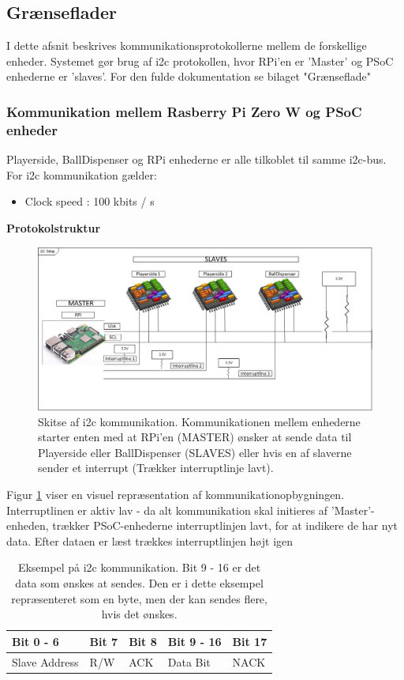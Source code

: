 \documentclass[Rapport/Rapport_main.tex]{subfiles}
\begin{document}
\subsection{Grænseflader}
I dette afsnit beskrives kommunikationsprotokollerne mellem de forskellige enheder. Systemet gør brug af i2c protokollen, hvor RPi'en er 'Master' og PSoC enhederne er 'slaves'. For den fulde dokumentation se bilaget "Grænseflade"
\subsubsection{Kommunikation mellem Rasberry Pi Zero W og PSoC enheder}
Playerside, BallDispenser og RPi enhederne er alle tilkoblet til samme i2c-bus. For i2c kommunikation gælder: 
\begin{itemize}
    \item Clock speed : 100 kbits / s 
\end{itemize}
\textbf{Protokolstruktur}
\begin{figure}[H]
    \centering
    \includegraphics[width=\textwidth]{Rapport/Arkitektur/graphics/I2C-Illustration.png}
   \caption{Skitse af i2c kommunikation. Kommunikationen mellem enhederne starter enten med at RPi'en (MASTER) ønsker at sende data til Playerside eller BallDispenser (SLAVES) eller hvis en af slaverne sender et interrupt (Trækker interruptlinje lavt).}
    \label{fig:sketch_interrut}
\end{figure}
Figur \ref{fig:sketch_interrut} viser en visuel repræsentation af kommunikationopbygningen. Interruptlinen er aktiv lav - da alt kommunikation skal initieres af 'Master'-enheden, trækker PSoC-enhederne interruptlinjen lavt, for at indikere de har nyt data. Efter dataen er læst trækkes interruptlinjen højt igen
\begin{table}[H]
    \centering
    \begin{tabular}{|L{0.2\textwidth}|L{0.15\textwidth}|L{0.15\textwidth}|L{0.15\textwidth}|L{0.15\textwidth}|}
\hline
\textbf{Bit 0 - 6} & \textbf{Bit 7} & \textbf{Bit 8} & \textbf{Bit 9 - 16}  & \textbf{Bit 17} \\ \hline
Slave Address & R/W & ACK & Data Bit & NACK \\ \hline
\end{tabular}
    \caption{Eksempel på i2c kommunikation. Bit 9 - 16 er det data som ønskes at sendes. Den er i dette eksempel repræsenteret som en byte, men der kan sendes flere, hvis det ønskes.}
\end{table}
\end{document}
